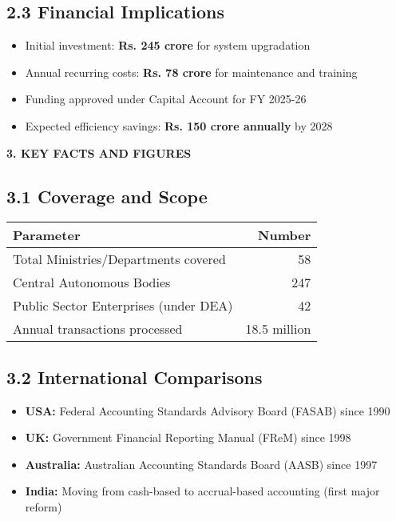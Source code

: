 \documentclass[12pt,a4paper]{article}
\newcommand{\sectionheader}[1]{\textbf{#1}}
\begin{document}
\subsection*{2.3 Financial Implications}
\begin{itemize}[leftmargin=*, itemsep=2pt]
    \item Initial investment: \textbf{Rs. 245 crore} for system upgradation
    \item Annual recurring costs: \textbf{Rs. 78 crore} for maintenance and training
    \item Funding approved under Capital Account for FY 2025-26
    \item Expected efficiency savings: \textbf{Rs. 150 crore annually} by 2028
\end{itemize}

\vspace{0.5cm}

\sectionheader{3. KEY FACTS AND FIGURES}

\subsection*{3.1 Coverage and Scope}
\begin{table}[h]
\centering
\begin{tabular}{@{}lr@{}}
\toprule
\textbf{Parameter} & \textbf{Number} \\
\midrule
Total Ministries/Departments covered & 58 \\
Central Autonomous Bodies & 247 \\
Public Sector Enterprises (under DEA) & 42 \\
Annual transactions processed & 18.5 million \\
\bottomrule
\end{tabular}
\end{table}

\subsection*{3.2 International Comparisons}
\begin{itemize}[leftmargin=*, itemsep=2pt]
    \item \textbf{USA:} Federal Accounting Standards Advisory Board (FASAB) since 1990
    \item \textbf{UK:} Government Financial Reporting Manual (FReM) since 1998
    \item \textbf{Australia:} Australian Accounting Standards Board (AASB) since 1997
    \item \textbf{India:} Moving from cash-based to accrual-based accounting (first major reform)
\end{itemize}
\end{document}
